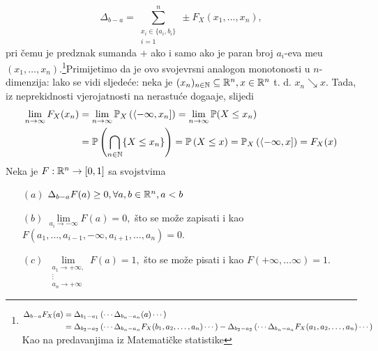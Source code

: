 \documentclass{article}
\begin{document}
\[\Delta_{b-a}=\sum_{\substack{x_i\in\{a_i,b_i\}\\i=1}}^n\pm F_X(x_1,\ldots,x_n),\] pri čemu je predznak sumanda \(+\) ako i samo ako je paran broj \(a_i\)-eva me\dj{}u \((x_1,\ldots,x_n).\)\footnote[2]{\newline\(\small{\begin{aligned}\Delta_{b-a}F_X(a)&=\Delta_{b_1-a_1}\left(\cdots\Delta_{b_n-a_n}(a)\cdots\right)\\&=\Delta_{b_2-a_2}\left(\cdots\Delta_{b_n-a_n}F_X(b_1,a_2,\ldots,a_n)\cdots\right)-\Delta_{b_2-a_2}\left(\cdots\Delta_{b_n-a_n}F_X(a_1,a_2,\ldots,a_n)\cdots\right)\end{aligned}}\)\newline Kao na predavanjima iz Matematičke statistike}\newline Primijetimo da je ovo svojevrsni analogon monotonosti u \(n\)-dimenzija: lako se vidi sljedeće: neka je \((x_n)_{n\in\Bbb N}\subseteq\Bbb R^n,x\in\Bbb R^n\) t. d. \(x_n\searrow x.\) Tada, iz neprekidnosti vjerojatnosti na nerastuće doga\dj{}aje, slijedi \[\begin{aligned}\lim_{n\to\infty}F_X(x_n)&=\lim_{n\to\infty}\Bbb P_X\left(\langle -\infty,x_n]\right)=\lim_{n\to\infty}\Bbb P(X\le x_n)\\&=\Bbb P\left(\bigcap_{n\in\Bbb N}\{X\le x_n\}\right)=\Bbb P\left(X\le x\right)=\Bbb P_X\left(\langle-\infty,x]\right)=F_X(x)\end{aligned}\] \newline\newline
Neka je \(F:\Bbb R^n\to [0,1]\) sa svojstvima 
\begin{enumerate}
    \item[\((a)\)] \(\Delta_{b-a}F(a)\ge 0, \forall a,b\in\Bbb R^n,a<b\)
    \item[\((b)\)] \(\lim\limits_{a_i\to-\infty}F(a)=0,\) što se može zapisati i kao \(F(a_1,\ldots,a_{i-1},-\infty,a_{i+1},\ldots,a_n)=0.\)
    \item[\((c)\)] \(\lim\limits_{\substack{a_1\to+\infty,\\\vdots\\a_n\to+\infty}}F(a)=1,\) što se može pisati i kao \(F(+\infty,\ldots\infty)=1.\) 
\end{enumerate}
\end{document}
